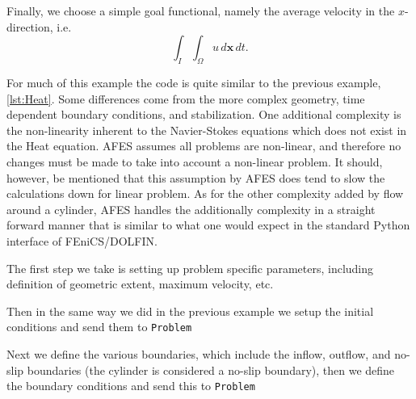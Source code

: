     Finally, we choose a simple goal functional, namely the average velocity in
    the $x$-direction, i.e.
    \begin{equation}
        \int_{I}\!\int_{\Omega} u\, d\mathbf{x}\,dt.
        \label{eq:NSEGoal}
    \end{equation}

    For much of this example the code is quite similar to the previous example,
    \autoref{lst:Heat}.  Some differences come from the more complex geometry,
    time dependent boundary conditions, and stabilization. One additional
    complexity is the non-linearity inherent to the Navier-Stokes equations
    which does not exist in the Heat equation. AFES assumes all problems are
    non-linear, and therefore no changes must be made to take into account a
    non-linear problem.  It should, however, be mentioned that this assumption
    by AFES does tend to slow the calculations down for linear problem. As for
    the other complexity added by flow around a cylinder, AFES handles the
    additionally complexity in a straight forward manner that is similar to what
    one would expect in the standard Python interface of FEniCS/DOLFIN.

    The first step we take is setting up problem specific parameters, including
    definition of geometric extent, maximum velocity, etc.
    
    Then in the same way we did in the previous example we setup the initial
    conditions and send them to \texttt{Problem}
    
    
    

    Next we define the various boundaries, which include the inflow, outflow,
    and no-slip boundaries (the cylinder is considered a no-slip boundary), then
    we define the boundary conditions and send this to \texttt{Problem}
    
    
    
    

